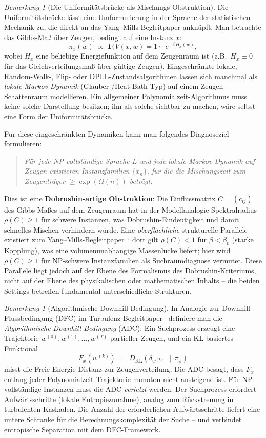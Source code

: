 \documentclass[aps,prd,twocolumn,superscriptaddress,nofootinbib]{revtex4-2}
\theoremstyle{definition}
\theoremstyle{remark}
\newtheorem{remark}[theorem]{Bemerkung}
\begin{document}
\begin{remark}[Die Uniformitätsbrücke als Mischungs-Obstruktion]
\label{rem:mixing-obstruction}
Die Uniformitätsbrücke lässt eine Umformulierung in der Sprache der statistischen Mechanik zu, die direkt an das Yang--Mills-Begleitpaper anknüpft. Man betrachte das Gibbs-Maß über Zeugen, bedingt auf eine Instanz $x$:
\[
\pi_x(w) \;\propto\; \mathbf{1}\{V(x,w) = 1\} \cdot e^{-\beta H_x(w)},
\]
wobei $H_x$ eine beliebige Energiefunktion auf dem Zeugenraum ist (z.B.\ $H_x \equiv 0$ für das Gleichverteilungsmaß über gültige Zeugen). Eingeschränkte lokale, Random-Walk-, Flip- oder DPLL-Zustandsalgorithmen lassen sich manchmal als \emph{lokale Markov-Dynamik} (Glauber-/Heat-Bath-Typ) auf einem Zeugen-Schattenraum modellieren. Ein allgemeiner Polynomialzeit-Algorithmus muss keine solche Darstellung besitzen; ihn als solche sichtbar zu machen, wäre selbst eine Form der Uniformitätsbrücke.

Für diese eingeschränkten Dynamiken kann man folgendes Diagnoseziel formulieren:
\begin{quote}
\emph{Für jede NP-vollständige Sprache $L$ und jede lokale Markov-Dynamik auf Zeugen existieren Instanzfamilien $\{x_n\}$, für die die Mischungszeit zum Zeugenträger $\geq \exp(\Omega(n))$ beträgt.}
\end{quote}
Dies ist eine \textbf{Dobrushin-artige Obstruktion}: Die Einflussmatrix $C = (c_{ij})$ des Gibbs-Maßes auf dem Zeugenraum hat in der Modellanalogie Spektralradius $\rho(C) \geq 1$ für schwere Instanzen, was Dobrushin-Eindeutigkeit und damit schnelles Mischen verhindern würde. Eine \emph{oberflächliche} strukturelle Parallele existiert zum Yang--Mills-Begleitpaper~\cite{Geiger2026-YM}: dort gilt $\rho(C) < 1$ für $\beta < \beta_0$ (starke Kopplung), was eine volumenunabhängige Massenlücke liefert; hier wird $\rho(C) \geq 1$ für NP-schwere Instanzfamilien als Suchraumdiagnose vermutet. Diese Parallele liegt jedoch auf der Ebene des Formalismus des Dobrushin-Kriteriums, nicht auf der Ebene des physikalischen oder mathematischen Inhalts -- die beiden Settings betreffen fundamental unterschiedliche Strukturen.
\end{remark}

\begin{remark}[Algorithmische Downhill-Bedingung]
\label{rem:algorithmic-downhill}
In Analogie zur Downhill-Flussbedingung (DFC) im Turbulenz-Begleitpaper~\cite{Geiger2026-TU} definiere man die \emph{Algorithmische Downhill-Bedingung} (ADC): Ein Suchprozess erzeugt eine Trajektorie $w^{(0)}, w^{(1)}, \ldots, w^{(T)}$ partieller Zeugen, und ein KL-basiertes Funktional
\[
F_x(w^{(k)}) \;=\; D_{\mathrm{KL}}\!\left(\delta_{w^{(k)}} \,\|\, \pi_x\right)
\]
misst die \glqq Freie-Energie-Distanz\grqq{} zur Zeugenverteilung. Die ADC besagt, dass $F_x$ entlang jeder Polynomialzeit-Trajektorie monoton nicht-ansteigend ist. Für NP-vollständige Instanzen muss die ADC \emph{verletzt} werden: Der Suchprozess erfordert \glqq Aufwärtsschritte\grqq{} (lokale Entropiezunahme), analog zum Rückstreuung in turbulenten Kaskaden. Die Anzahl der erforderlichen Aufwärtsschritte liefert eine untere Schranke für die Berechnungskomplexität der Suche -- und verbindet entropische Separation mit dem DFC-Framework.
\end{remark}
\end{document}
